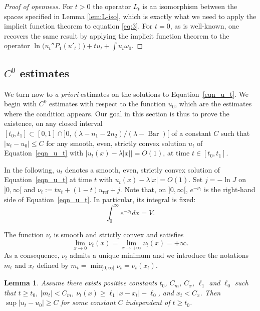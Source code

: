 \documentclass[JEP,XML,SOM,Unicode, NoEqCountersInSection, NoFloatCountersInSection]{cedram}
\theoremstyle{plain}
\newtheorem{lem}[thm]{Lemma}
\theoremstyle{definition}
\DeclareMathOperator{\barDH}{Bar}
\begin{document}
\begin{proof}[Proof of openness]
For $t>0$ the operator $L_t$ is an isomorphism between the spaces specified in Lemma \ref{lem:L-iso}, which is exactly what we need to apply the implicit function theorem to equation \eqref{eq:3}. For $t=0$, as is well-known, one recovers the same result by applying the implicit function theorem to the operator $\ln \big( u_t''P_1(u'_t) \big) + t u_t + \int u_t\omega_0$.
\end{proof}

\subsection{$C^0$ estimates}

We turn now to \emph{a priori} estimates on the solutions to Equation~\eqref{eqn_u_t}.
We begin with $C^0$ estimates with respect to the function $u_0$,
which are the estimates where the condition appears.
Our goal in this section is thus to prove the existence,
on any closed interval $[t_0,t_1]\subset [0,1]\cap{} ]0,(\lambda-n_1-2n_2)/(\lambda-\barDH)[$
of a constant $C$ such that
$|u_t-u_0|\leq C$ for any smooth, even, strictly convex solution $u_t$ of
Equation~\eqref{eqn_u_t} with $|u_t(x)-\lambda|x||=O(1)$, at time $t\in [t_0,t_1]$.

In the following, $u_t$ denotes a smooth, even, strictly convex solution of
Equation~\eqref{eqn_u_t} at time $t$ with $u_t(x)-\lambda|x|=O(1)$.
Set $j=-\ln J$ on $]0,\infty[$ and
$ \nu_t:=tu_t+(1-t)u_{\mathrm{ref}}+j $.
Note that, on $]0,\infty[$, $e^{-\nu_t}$ is the right-hand side of Equation~\eqref{eqn_u_t}.
In particular, its integral is fixed:
\begin{equation}
\int_0^{\infty} e^{-\nu_t} dx= V.
\end{equation}

The function $\nu_t$ is smooth and strictly
convex and satisfies
$$\lim_{x\to 0}\nu_t(x)=
\lim_{x\to +\infty}\nu_t(x)=+\infty.$$
As a consequence, $\nu_t$ admits a unique minimum and we introduce
the notations $m_t$ and $x_t$ defined by
$m_t=\min_{]0,\infty[}\nu_t=\nu_t(x_t)$.


\begin{lem}
\label{lem_reduction}
Assume there exists positive constants $t_0$, $C_m$, $C_x$, $\ell_1$ and $\ell_0$
such that $t\geq t_0$, $|m_t|<C_m$, $\nu_t(x)\geq \ell_1|x-x_t|-\ell_0$, and $x_t<C_x$.
Then $\sup |u_t-u_0|\geq C$
for some constant $C$ independent of $t\geq t_0$.
\end{lem}
\end{document}
